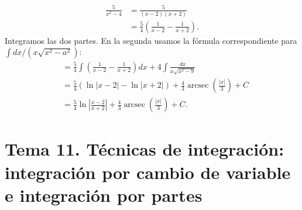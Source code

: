 \documentclass[12pt, letterpaper]{article}
\makeatletter
\renewcommand{\alph}[1]{\expandafter\@alphlatin\csname c@#1\endcsname}
\newcommand{\@alphlatin}[1]{\ifcase#1\or a\or b\or c\or d\or e\or f\or g\or h\or i\or j\or k\or l\or m\or n\or o\or p\or q\or r\or s\or t\or u\or v\or w\or x\or y\or z\else\@ctrerr\fi}
\newcommand{\arcsec}{\operatorname{arcsec}}
\makeatother
\begin{document}
\begin{enumerate}[label=\alph*)]
  \[
  \begin{aligned}
  \frac5{x^2-4}&=\frac5{(x-2)(x+2)}\\
  &=\frac54\left(\frac1{x-2}-\frac1{x+2}\right).
  \end{aligned}
  \]
  Integramos las dos partes. En la segunda usamos la fórmula correspondiente para $\int dx/(x\sqrt{x^2-a^2})$:
  \[
  \begin{aligned}
  &=\frac54\int\left(\frac1{x-2}-\frac1{x+2}\right)dx+4\int\frac{dx}{x\sqrt{x^2-9}}\\
  &=\frac54(\ln|x-2|-\ln|x+2|)+\frac43\arcsec\left(\frac{|x|}{3}\right)+C\\
  &=\boxed{\frac54\ln\left|\frac{x-2}{x+2}\right|+\frac43\arcsec\left(\frac{|x|}{3}\right)+C}.
  \end{aligned}
  \]
\end{enumerate}



\newpage
\section{Tema 11. Técnicas de integración: integración por cambio de variable e integración por partes}
\end{document}
